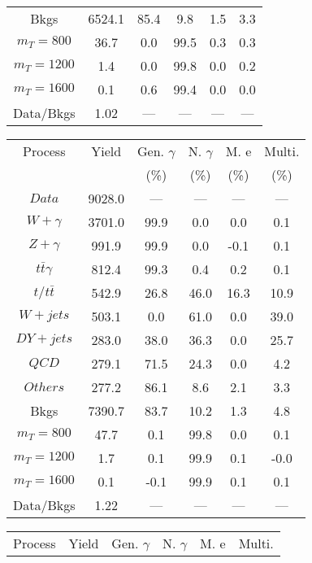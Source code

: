 \begin{figure}
\begin{minipage}[c]{0.32\textwidth}
{\begin{tabular}{cccccc}
Bkgs &  6524.1 &  85.4 &  9.8 &  1.5 &  3.3\\
$ m_{T} = 800 $ &  36.7 &  0.0 &  99.5 &  0.3 &  0.3\\
$ m_{T} = 1200 $ &  1.4 &  0.0 &  99.8 &  0.0 &  0.2\\
$ m_{T} = 1600 $ &  0.1 &  0.6 &  99.4 &  0.0 &  0.0\\
Data/Bkgs &  1.02 &  --- &  --- &  --- &  ---\\
\hline
\end{tabular}
}
\end{minipage}
\begin{minipage}[c]{0.32\textwidth}
\centering
\tiny{
\begin{tabular}{cccccc}
\hline
Process & Yield & Gen. $\gamma$ & N. $\gamma$ & M. e & Multi. \\
 &  & (\%) & (\%) & (\%) & (\%)  \\
\hline
                                                                      $ Data $ &  9028.0 &  --- &  --- &  --- &  ---\\
$ W+\gamma $ &  3701.0 &  99.9 &  0.0 &  0.0 &  0.1\\
$ Z+\gamma $ &  991.9 &  99.9 &  0.0 &  -0.1 &  0.1\\
$ t\bar{t}\gamma $ &  812.4 &  99.3 &  0.4 &  0.2 &  0.1\\
$ t/t\bar{t} $ &  542.9 &  26.8 &  46.0 &  16.3 &  10.9\\
$ W+jets $ &  503.1 &  0.0 &  61.0 &  0.0 &  39.0\\
$ DY+jets $ &  283.0 &  38.0 &  36.3 &  0.0 &  25.7\\
$ QCD $ &  279.1 &  71.5 &  24.3 &  0.0 &  4.2\\
$ Others $ &  277.2 &  86.1 &  8.6 &  2.1 &  3.3\\
Bkgs &  7390.7 &  83.7 &  10.2 &  1.3 &  4.8\\
$ m_{T} = 800 $ &  47.7 &  0.1 &  99.8 &  0.0 &  0.1\\
$ m_{T} = 1200 $ &  1.7 &  0.1 &  99.9 &  0.1 &  -0.0\\
$ m_{T} = 1600 $ &  0.1 &  -0.1 &  99.9 &  0.1 &  0.1\\
Data/Bkgs &  1.22 &  --- &  --- &  --- &  ---\\
\hline
\end{tabular}
}
\end{minipage}
\begin{minipage}[c]{0.32\textwidth}
\centering
\tiny{
\begin{tabular}{cccccc}
\hline
Process & Yield & Gen. $\gamma$ & N. $\gamma$ & M. e & Multi. \\

\end{tabular}}
\end{minipage}
\end{figure}
